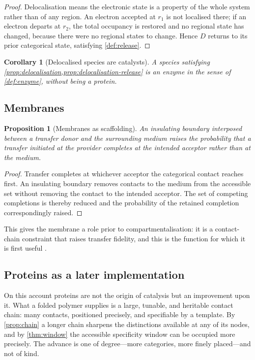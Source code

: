 \documentclass[11pt,twocolumn,a4paper]{article}
\theoremstyle{plain}
\newtheorem{proposition}[theorem]{Proposition}
\newtheorem{corollary}[theorem]{Corollary}
\theoremstyle{definition}
\theoremstyle{remark}
\begin{document}
\begin{proof}
Delocalisation means the electronic state is a property of the whole system
rather than of any region. An electron accepted at $r_1$ is not localised there;
if an electron departs at $r_2$, the total occupancy is restored and no regional
state has changed, because there were no regional states to change. Hence $D$
returns to its prior categorical state, satisfying \cref{def:release}.
\end{proof}

\begin{corollary}[Delocalised species are catalysts]
\label{cor:delocalised-catalyst}
A species satisfying
\cref{prop:delocalisation,prop:delocalisation-release} is an enzyme in the sense
of \cref{def:enzyme}, without being a protein.
\end{corollary}

\subsection{Membranes}

\begin{proposition}[Membranes as scaffolding]
\label{prop:membrane}
An insulating boundary interposed between a transfer donor and the surrounding
medium raises the probability that a transfer initiated at the provider
completes at the intended acceptor rather than at the medium.
\end{proposition}

\begin{proof}
Transfer completes at whichever acceptor the categorical contact reaches first.
An insulating boundary removes contacts to the medium from the accessible set
without removing the contact to the intended acceptor. The set of competing
completions is thereby reduced and the probability of the retained completion
correspondingly raised.
\end{proof}

This gives the membrane a role prior to compartmentalisation: it is a
contact-chain constraint that raises transfer fidelity, and this is the
function for which it is first useful \citep{deamer2017,mitchell1961,
martin2008}.

\subsection{Proteins as a later implementation}

On this account proteins are not the origin of catalysis but an improvement upon
it. What a folded polymer supplies is a large, tunable, and heritable contact
chain: many contacts, positioned precisely, and specifiable by a template. By
\cref{prop:chain} a longer chain sharpens the distinctions available at any of
its nodes, and by \cref{thm:window} the accessible specificity window can be
occupied more precisely. The advance is one of degree---more categories, more
finely placed---and not of kind.
\end{document}
